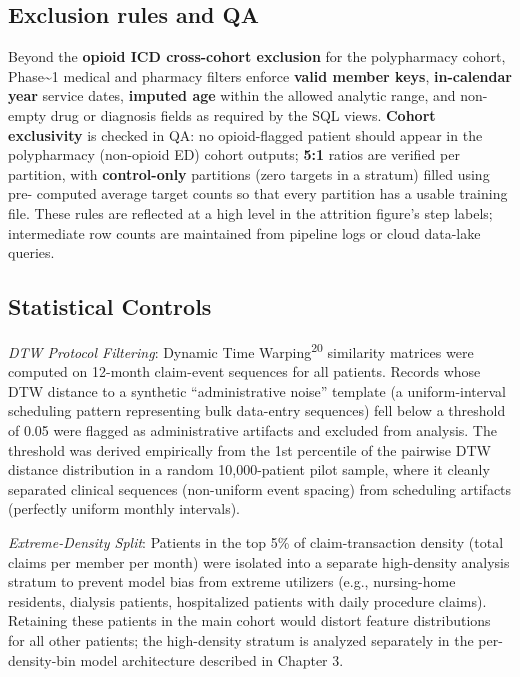 \documentclass[
  12pt,
]{book}
\begin{document}
\subsection{Exclusion rules and QA}\label{exclusion-rules-and-qa}

Beyond the \textbf{opioid ICD cross-cohort exclusion} for the
polypharmacy cohort, Phase\textasciitilde1 medical and pharmacy filters
enforce \textbf{valid member keys}, \textbf{in-calendar year} service
dates, \textbf{imputed age} within the allowed analytic range, and
non-empty drug or diagnosis fields as required by the SQL views.
\textbf{Cohort exclusivity} is checked in QA: no opioid-flagged patient
should appear in the polypharmacy (non-opioid ED) cohort outputs;
\textbf{5:1} ratios are verified per partition, with
\textbf{control-only} partitions (zero targets in a stratum) filled
using pre- computed average target counts so that every partition has a
usable training file. These rules are reflected at a high level in the
attrition figure's step labels; intermediate row counts are maintained
from pipeline logs or cloud data-lake queries.

\subsection{Statistical Controls}\label{statistical-controls}

\emph{DTW Protocol Filtering}: Dynamic Time Warping\textsuperscript{20}
similarity matrices were computed on 12-month claim-event sequences for
all patients. Records whose DTW distance to a synthetic ``administrative
noise'' template (a uniform-interval scheduling pattern representing
bulk data-entry sequences) fell below a threshold of 0.05 were flagged
as administrative artifacts and excluded from analysis. The threshold
was derived empirically from the 1st percentile of the pairwise DTW
distance distribution in a random 10,000-patient pilot sample, where it
cleanly separated clinical sequences (non-uniform event spacing) from
scheduling artifacts (perfectly uniform monthly intervals).

\emph{Extreme-Density Split}: Patients in the top 5\% of
claim-transaction density (total claims per member per month) were
isolated into a separate high-density analysis stratum to prevent model
bias from extreme utilizers (e.g., nursing-home residents, dialysis
patients, hospitalized patients with daily procedure claims). Retaining
these patients in the main cohort would distort feature distributions
for all other patients; the high-density stratum is analyzed separately
in the per-density-bin model architecture described in Chapter 3.
\end{document}
